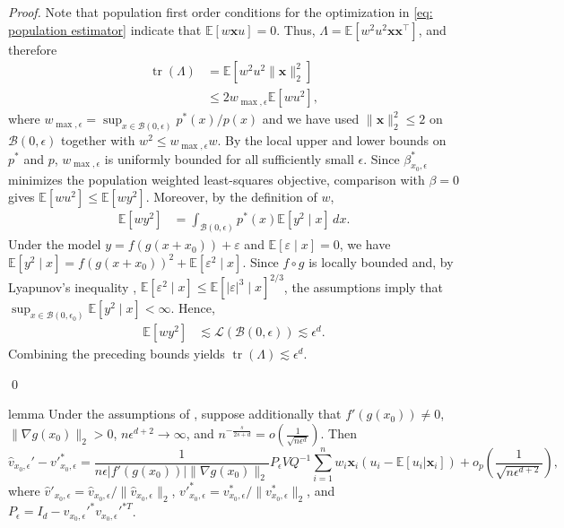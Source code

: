 \documentclass[11pt]{article}
\begin{document}
\begin{appendices}
\noindent \textit{Proof.} Note that population first order conditions for the optimization in \cref{eq: population estimator} indicate that $\mathbb{E}[w\boldsymbol{x}u] = 0$. Thus, $\Lambda = \mathbb{E}[w^2u^2\boldsymbol{x}\boldsymbol{x}^{\top}]$, and therefore
\begin{align*}
    \operatorname{tr}(\Lambda)
    &= \mathbb{E}\left[w^2u^2\|\boldsymbol{x}\|_2^2\right] \\
    &\leq 2w_{\max,\epsilon}\mathbb{E}\left[wu^2\right],
\end{align*}
where $w_{\max,\epsilon} = \sup_{x \in \mathcal{B}(0, \epsilon)}p^*(x)/p(x)$ and we have used $\|\boldsymbol{x}\|_2^2\leq 2$ on $\mathcal{B}(0,\epsilon)$ together with $w^2\leq w_{\max,\epsilon}w$. By the local upper and lower bounds on $p^*$ and $p$, $w_{\max,\epsilon}$ is uniformly bounded for all sufficiently small $\epsilon$. Since $\beta^*_{x_0,\epsilon}$ minimizes the population weighted least-squares objective, comparison with $\beta=0$ gives $\mathbb{E}[wu^2]\leq \mathbb{E}[wy^2]$. Moreover, by the definition of $w$,
\begin{align*}
    \mathbb{E}[wy^2]
    &= \int_{\mathcal{B}(0,\epsilon)}p^*(x)\mathbb{E}[y^2\mid x]\,dx.
\end{align*}
Under the model $y=f(g(x+x_0))+\varepsilon$ and $\mathbb{E}[\varepsilon\mid x]=0$, we have $\mathbb{E}[y^2\mid x]=f(g(x+x_0))^2+\mathbb{E}[\varepsilon^2\mid x]$. Since $f\circ g$ is locally bounded and, by Lyapunov's inequality \citep[Theorem 2.5]{gut2013probability}, $\mathbb{E}[\varepsilon^2\mid x]\leq \mathbb{E}[|\varepsilon|^3\mid x]^{2/3}$, the assumptions imply that $\sup_{x\in\mathcal{B}(0,\epsilon_0)}\mathbb{E}[y^2\mid x]<\infty$. Hence,
\begin{align*}
    \mathbb{E}[wy^2]
    &\lesssim \mathcal{L}(\mathcal{B}(0,\epsilon))
    \lesssim \epsilon^d.
\end{align*}
Combining the preceding bounds yields $\operatorname{tr}(\Lambda)\lesssim\epsilon^d$.

\qed{}

\begin{restatable}{lemma}{} \label{lemma: norm velocity decomp}
    Under the assumptions of , suppose additionally that $f'(g(x_0)) \neq 0$, $\|\nabla g(x_0)\|_2>0$, $n\epsilon^{d+2}\rightarrow\infty$, and $n^{-\frac{s}{2s+d}} = o\left(\frac{1}{\sqrt{n\epsilon^d}}\right).$ Then
    \begin{equation}
        \hat{v}_{x_0, \epsilon}' - v'^*_{x_0, \epsilon} = \frac{1}{n\epsilon |f'(g(x_0))|\|\nabla g(x_0)\|_2}P_\epsilon VQ^{-1}\sum_{i = 1}^nw_i\boldsymbol{x}_i(u_i - \mathbb{E}[u_i|\boldsymbol{x}_i]) +o_p\left(\frac{1}{\sqrt{n\epsilon^{d+2}}}\right),
    \end{equation}
    where $\hat{v}'_{x_0, \epsilon} = \hat{v}_{x_0, \epsilon}/\|\hat{v}_{x_0, \epsilon}\|_2$, $v'^*_{x_0, \epsilon} = v^*_{x_0, \epsilon}/\|v^*_{x_0, \epsilon}\|_2$, and $P_\epsilon = I_d - v_{x_0, \epsilon}'^{*}v_{x_0, \epsilon}'^{*T}$.
\end{restatable}


\end{appendices}
\end{document}
